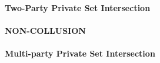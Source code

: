 \paragraph{Two-Party Private Set Intersection}




\paragraph{NON-COLLUSION}

\paragraph{Multi-party Private Set Intersection}
